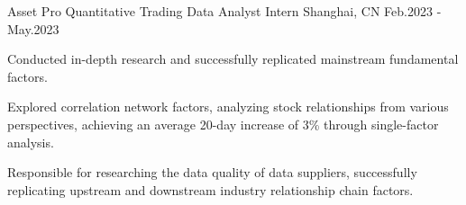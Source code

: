 

\begin{cventries}


  \begin{cventry}
    {Asset Pro}
    {Quantitative Trading Data Analyst Intern}
    {Shanghai, CN}
    {Feb.2023 - May.2023}
    {
      \begin{cvitems}
        \item {Conducted in-depth research and successfully replicated mainstream fundamental factors.}
        \item {Explored correlation network factors, analyzing stock relationships from various perspectives, achieving an average 20-day increase of 3\% through single-factor analysis.}
        \item {Responsible for researching the data quality of data suppliers, successfully replicating upstream and downstream industry relationship chain factors.}
      \end{cvitems}
    }
    \end{cventry}


\end{cventries}
